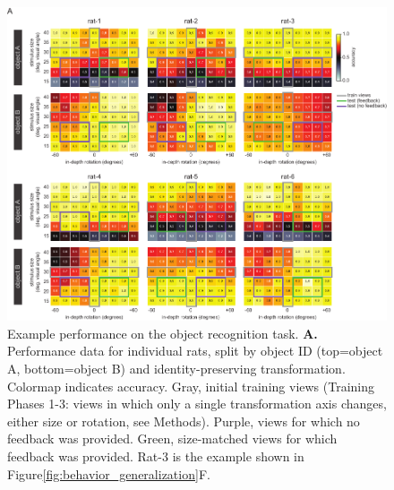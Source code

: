 \begin{figure}[hbt!]
\includegraphics[width=\textwidth]{figures/supplemental/fig_s3_heatmaps_per_rat/fig_s3_heatmaps_per_rat.pdf}
    \centering
    \caption[Invariance performance for individual rats]{Example performance on the object recognition task.
    \textbf{A.} Performance data for individual rats, split by object ID (top=object A, bottom=object B) and identity-preserving transformation. Colormap indicates accuracy. Gray, initial training views (Training Phases 1-3: views in which only a single transformation axis changes, either size or rotation, see Methods). Purple, views for which no feedback was provided. Green, size-matched views for which feedback was provided. Rat-3 is the example shown in Figure\ref{fig:behavior_generalization}F.
    \label{supfig:heatmaps}}
\end{figure}

